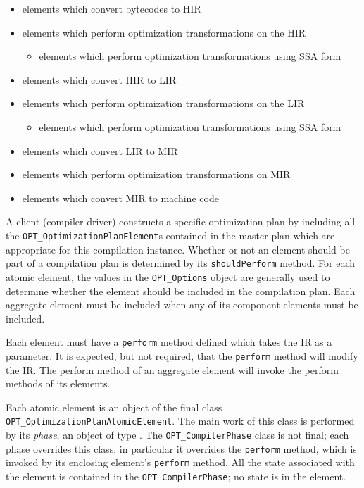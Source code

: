 \begin{itemize}
\item elements which convert bytecodes to HIR
\item elements which perform optimization transformations on the HIR
   \begin{itemize}
   \item elements which perform optimization transformations using SSA form
   \end{itemize}
\item elements which convert HIR to LIR
\item elements which perform optimization transformations on the LIR
   \begin{itemize}
   \item elements which perform optimization transformations using SSA form
   \end{itemize}
\item elements which convert LIR to MIR
\item elements which perform optimization transformations on MIR 
\item elements which convert MIR to machine code
\end{itemize}


A client (compiler driver) constructs a specific optimization plan by including all the 
{\tt OPT\_OptimizationPlanElement}s contained in the master plan which are 
appropriate for this compilation instance. 
Whether or not an element should be part of a compilation plan is determined 
by its {\tt shouldPerform} method. For each atomic element, the values in the
{\tt OPT\_Options} object are generally used to determine whether the element
should be included in the compilation plan. Each aggregate element must be 
included when any of its component elements must be included. 

Each element must have a {\tt perform} method defined which takes the IR as
a parameter. It is expected, but not required, that the {\tt perform}
method will modify the IR. 
The perform method of an aggregate element will invoke the 
perform methods of its elements.

Each atomic element is an object of the final class 
{\tt OPT\_OptimizationPlanAtomicElement}. The main work of this class
is performed by its {\em phase}, an object of type 
. The
{\tt OPT\_CompilerPhase} class is not final; each phase overrides this class,
in particular it overrides the {\tt perform} method, which is invoked by its 
enclosing element's {\tt perform} method. All the state associated with 
the element
is contained in the {\tt OPT\_CompilerPhase}; no
state is in the element.

